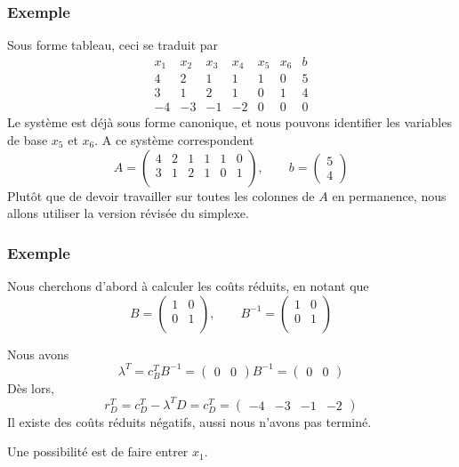 \documentclass[usepdftitle=false]{beamer}
\begin{document}
\begin{frame}
\frametitle{Exemple}

Sous forme tableau, ceci se traduit par
\[
\begin{matrix}
x_1 & x_2 & x_3 & x_4 & x_5 & x_6 & b \\
4 & 2 & 1 & 1 & 1 & 0 & 5 \\
3 & 1 & 2 & 1 & 0 & 1 & 4 \\
-4 & -3 & -1 & -2 & 0 & 0 & 0
\end{matrix}
\]
Le système est déjà sous forme canonique, et nous pouvons identifier les variables de base $x_5$ et $x_6$. A ce système correspondent
\[
A = \begin{pmatrix}
4 & 2 & 1 & 1 & 1 & 0 \\
3 & 1 & 2 & 1 & 0 & 1 \\
\end{pmatrix},\qquad
b = \begin{pmatrix} 5 \\ 4 \end{pmatrix}
\]
Plutôt que de devoir travailler sur toutes les colonnes de $A$ en permanence, nous allons utiliser la version révisée du simplexe.

\end{frame}

\begin{frame}
\frametitle{Exemple}

Nous cherchons d'abord à calculer les coûts réduits, en notant que
\[
B = \begin{pmatrix}
1 & 0 \\
0 & 1 \\
\end{pmatrix},\qquad 
B^{-1} = \begin{pmatrix}
1 & 0 \\
0 & 1 \\
\end{pmatrix}
\]

Nous avons
\[
\lambda^T = c_B^T B^{-1} =
\begin{pmatrix} 0 & 0 \end{pmatrix}B^{-1} = \begin{pmatrix} 0 & 0 \end{pmatrix}
\]
Dès lors,
\[
r_D^T = c_D^T - \lambda^T D = c_D^T =
\begin{pmatrix} -4 & -3 & -1 & -2 \end{pmatrix}
\]
Il existe des coûts réduits négatifs, aussi nous n'avons pas terminé.

\mbox{}

Une possibilité est de faire entrer $x_1$.

\end{frame}
\end{document}

